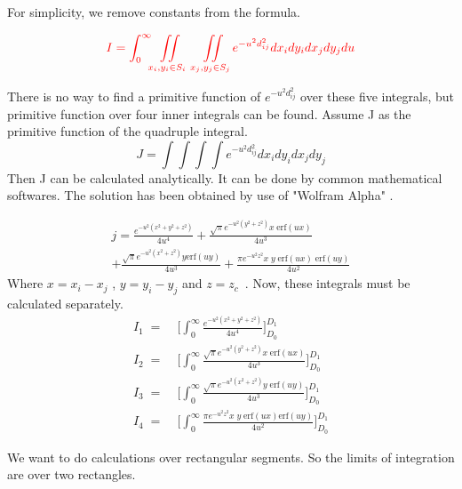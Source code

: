 \documentclass[final,5p,times,twocolumn]{elsarticle}
\begin{document}
For simplicity, we remove constants from the formula.

\begin{equation}
\label {eq10}
\textcolor{red}{
I = \int_0^{\infty}\iint\limits_{x_i, y_i \in S_i}\ \  \iint\limits_{x_j, y_j \in S_j}  e^{-u^2 d_{ij}^2} dx_i dy_i dx_j dy_j du
}
\end{equation}

There is no way to find a primitive function of $e^{-u^2 d_{ij}^2}$ over these five integrals, but primitive function over four inner integrals can be found. Assume J as the primitive function of the quadruple integral.
\begin{equation}
\label {eq11}
J = \int \int \int \int e^{-u^2 d_{ij}^2 } dx_i dy_i dx_j dy_j  
\end{equation}
Then J can be calculated analytically. It can be done by common mathematical softwares. The solution has been obtained by use of "Wolfram Alpha" \cite{Wolfram}.

\begin{equation}\label {eq12}
\begin{split}
j = \frac{e^{-u^2(x^2+y^2+z^2)}}{4u^4} + \frac{\sqrt{\pi}e^{-u^2(y^2 + z^2)}x\; \mathrm{erf}(u x)}{4u^3} \\
+\frac{\sqrt{\pi}e^{-u^2(x^2 + z^2)}y \mathrm {erf}(u y)}{4u^3} + \frac{\pi e^{-u^2 z^2}x\;y\; \mathrm{erf}(u x)\; \mathrm{erf}(u y)}{4u^2}
\end{split}
\end{equation}
Where $x = x_i - x_j$ , $y = y_i - y_j$ and $z = z_c$\ . 
Now, these integrals must be calculated separately.
\begin{equation}\label {eq13}
\begin{split}
I_1\; = \;&\bigg[\int_0^{\infty}\frac{e^{-u^2(x^2+y^2+z^2)}} {4u^4}\bigg]_{D_0}^{D_1}\\
I_2\; = \;&\bigg[\int_0^{\infty}\frac{\sqrt{\pi}e^{-u^2(y^2 + z^2)}x\; \mathrm{erf}(u x)}{4u^3}\bigg]_{D_0}^{D_1}\\
I_3\; = \;&\bigg[\int_0^{\infty}\frac{\sqrt{\pi}e^{-u^2(x^2 + z^2)}y\; \mathrm {erf}(u y)}{4u^3}\bigg]_{D_0}^{D_1}\\
I_4\; = \;&\bigg[\int_0^{\infty}\frac{\pi e^{-u^2 z^2}x\; y\; \mathrm{erf}(u x) \mathrm{erf}(u y)}{4u^2}\bigg]_{D_0}^{D_1}
\end{split}
\end{equation}

We want to do calculations over rectangular segments. So the limits of integration are over two rectangles.
\end{document}
